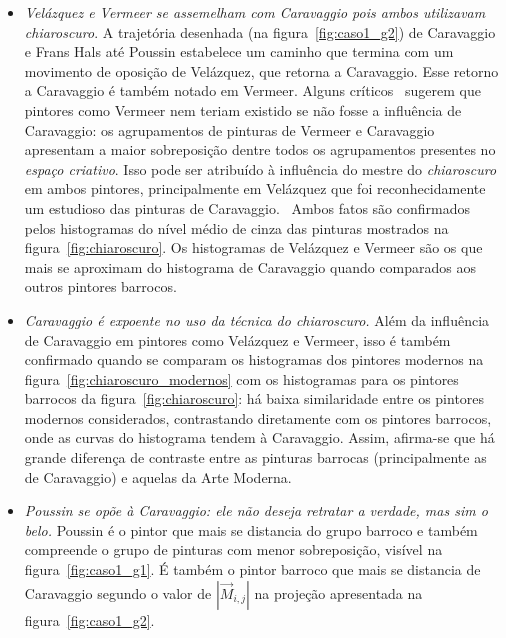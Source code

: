 \begin{itemize}
  \item \textit{Velázquez e Vermeer se assemelham com Caravaggio pois
    ambos utilizavam \textit{chiaroscuro}}. A trajetória desenhada (na
    figura~\ref{fig:caso1_g2}) de Caravaggio e Frans Hals até Poussin
    estabelece um caminho que termina com um movimento de oposição
    de Vel\'{a}zquez, que retorna a Caravaggio. Esse retorno a Caravaggio é também notado em Vermeer. Alguns críticos~\cite{lambert} sugerem que
    pintores como Vermeer nem teriam existido se não fosse a
    influência de Caravaggio: os agrupamentos de pinturas de Vermeer e
    Caravaggio apresentam a maior sobreposição dentre todos os
    agrupamentos presentes no \textit{espaço criativo}. Isso pode ser
    atribuído à influência do mestre do \textit{chiaroscuro} em ambos
    pintores, principalmente em Vel\'{a}zquez que foi reconhecidamente
    um estudioso das pinturas de Caravaggio.~\cite{gombrich} Ambos
    fatos são confirmados pelos histogramas do nível médio de cinza
    das pinturas mostrados na figura~\ref{fig:chiaroscuro}. Os
    histogramas de Velázquez e Vermeer são os que mais se aproximam do
    histograma de Caravaggio quando comparados aos outros pintores
    barrocos.

    \item \textit{Caravaggio é expoente no uso da técnica
      do \textit{chiaroscuro}.} Além da influência de Caravaggio em
      pintores como Velázquez e Vermeer, isso é também confirmado
      quando se comparam os histogramas dos pintores modernos na
      figura~\ref{fig:chiaroscuro_modernos} com os histogramas para os
      pintores barrocos da figura~\ref{fig:chiaroscuro}: há baixa
      similaridade entre os pintores modernos considerados,
      contrastando diretamente com os pintores barrocos, onde as
      curvas do histograma tendem à Caravaggio. Assim, afirma-se que há grande
      diferença de contraste entre as pinturas barrocas
      (principalmente as de Caravaggio) e aquelas da Arte Moderna.

    \item \textit{Poussin se opõe à Caravaggio: ele não deseja
retratar a verdade, mas sim o belo.} Poussin é o pintor que mais se
distancia do grupo barroco e também compreende o grupo de pinturas com
menor sobreposição, visível na figura~\ref{fig:caso1_g1}. É também o
pintor barroco que mais se distancia de Caravaggio segundo o valor de
$|\vec{M}_{i,j}|$ na projeção apresentada na
figura~\ref{fig:caso1_g2}.

\end{itemize}

